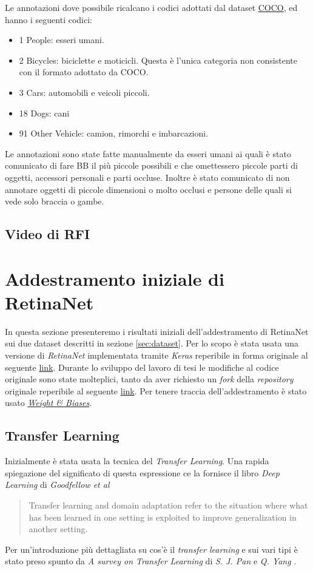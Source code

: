 Le annotazioni dove possibile ricalcano i codici adottati dal dataset \href{http://cocodataset.org/}{COCO}, ed hanno i seguenti codici:
\begin{itemize}
    \item 1 People: esseri umani.
    \item 2 Bicycles: biciclette e moticicli. Questa è l'unica categoria non consistente con il formato adottato da COCO.
    \item 3 Cars: automobili e veicoli piccoli.
    \item 18 Dogs: cani 
    \item 91 Other Vehicle: camion, rimorchi e imbarcazioni.
\end{itemize}

Le annotazioni sono state fatte manualmente da esseri umani ai quali è stato comunicato di fare \ac{BB} il più piccole possibili e che omettessero piccole parti di oggetti, accessori personali e parti occluse. Inoltre è stato comunicato di non annotare oggetti di piccole dimensioni o molto occlusi e persone delle quali si vede solo braccia o gambe.

\subsection{Video di RFI}
\label{subsec:rfi_video}

\section{Addestramento iniziale di RetinaNet}
\label{sec:addestramento_iniziale_di_retinanet}
In questa sezione presenteremo i risultati iniziali dell'addestramento di RetinaNet sui due dataset descritti in sezione \ref{sec:dataset}. Per lo scopo è stata usata una versione di \textit{RetinaNet} implementata tramite \textit{Keras} reperibile in forma originale al seguente \href{https://github.com/fizyr/keras-retinanet}{link}. Durante lo sviluppo del lavoro di tesi le modifiche al codice originale sono state molteplici, tanto da aver richiesto un \textit{fork} della \textit{repository} originale reperibile al seguente \href{https://github.com/iskorini/keras-retinanet}{link}. Per tenere traccia dell'addestramento è stato usato \href{https://www.wandb.com}{\textit{Weight \& Biases}}.
\subsection{Transfer Learning}
\label{subsec:transfer_learning}
Inizialmente è stata usata la tecnica del \textit{Transfer Learning}. Una rapida spiegazione del significato di questa espressione ce la fornisce il libro \textit{Deep Learning} di \textit{Goodfellow et al} \cite{Goodfellow-et-al-2016}
\begin{quote}
    Transfer learning and domain adaptation refer to the situation where what has been learned in one setting is exploited to improve generalization in another setting.
\end{quote}
Per un'introduzione più dettagliata su cos'è il \textit{transfer learning} e sui vari tipi è stato preso spunto da \textit{A survey on Transfer Learning} di \textit{S. J. Pan} e \textit{Q. Yang} \cite{5288526}. 

